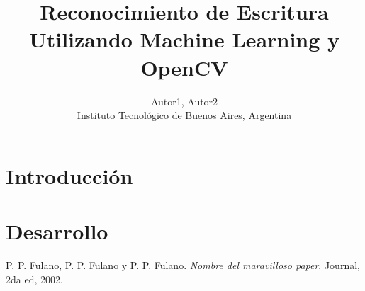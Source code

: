 

\usepackage[procnames]{listings}


\title{Reconocimiento de Escritura Utilizando Machine Learning y OpenCV}
\author{Autor1, Autor2\\
\small{Instituto Tecnológico de Buenos Aires, Argentina}}

\twocolumn[
  \begin{@twocolumnfalse}
    \maketitle
    \begin{abstract}
		
	\end{abstract}
  \end{@twocolumnfalse}
  ]

\section{Introducción}

	
\section{Desarrollo}



\begin{thebibliography}{9}

P. P. Fulano, P. P. Fulano y P. P. Fulano. \textit{Nombre del maravilloso paper}. Journal, 2da ed, 2002.


\end{thebibliography}

